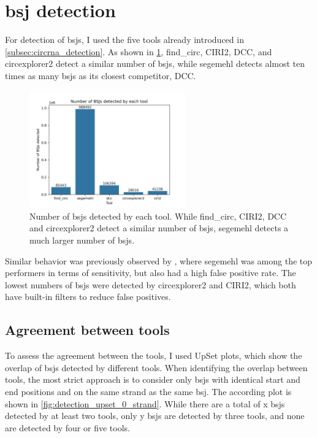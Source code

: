 \section{\Acrfull{bsj} detection}

For detection of \gls{bsj}s, I used the five tools already introduced in
\cref{subsec:circrna_detection}.
As shown in \cref{fig:detection_bars}, find\_circ, CIRI2, DCC, and
circexplorer2 detect a similar number of \gls{bsj}s, while segemehl detects
almost ten times as many \gls{bsj}s as its closest competitor, DCC.

\begin{figure}[ht] \centering

    \includegraphics[width=0.6\textwidth]{chapters/4_results_and_discussion/figures/detection/n_bsjs_detected.png}
    \caption{Number of \gls{bsj}s detected by each tool.
        While find\_circ, CIRI2, DCC and circexplorer2 detect a similar number of
        \gls{bsj}s, segemehl detects a much larger number of \gls{bsj}s.
    }
    \label{fig:detection_bars}
\end{figure}
Similar behavior was previously observed by \textcite{zeng_comprehensive_2017},
where segemehl was among the top performers in terms of sensitivity, but also
had a high false positive rate.
The lowest numbers of \gls{bsj}s were detected by circexplorer2 and CIRI2,
which both have built-in filters to reduce false
positives\supercite{zhang_diverse_2016,gao_circular_2018}.

\subsection{Agreement between tools}

To assess the agreement between the tools, I used UpSet plots, which show the
overlap of \gls{bsj}s detected by different tools.
When identifying the overlap between tools, the most strict approach is to
consider only \gls{bsj}s with identical start and end positions and on the same
strand as the same \gls{bsj}.
The according plot is shown in \cref{fig:detection_upset_0_strand}.
While there are a total of x \gls{bsj}s detected by at least two tools, only y
\gls{bsj}s are detected by three tools, and none are detected by four or five
tools.

